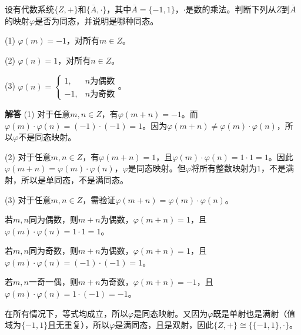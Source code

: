 \documentclass[a4paper,12pt]{ctexart}
\begin{document}
\begin{例题}[判断同态]
	设有代数系统$\{Z, +\}$和$\{\overline{A}, \cdot\}$，其中$\overline{A} = \{-1, 1\}$，$\cdot$是数的乘法。判断下列从$Z$到$\overline{A}$的映射$\varphi$是否为同态，并说明是哪种同态。
	
	(1) $\varphi(m) = -1$，对所有$m \in Z$。
	
	(2) $\varphi(n) = 1$，对所有$n \in Z$。
	
	(3) $\varphi(n)=\begin{cases}1, & n\text{为偶数}\\-1, & n\text{为奇数}\end{cases}$。
\end{例题}
\textbf{解答}\quad
(1) 对于任意$m, n \in Z$，有$\varphi(m+n) = -1$。而$\varphi(m) \cdot \varphi(n) = (-1) \cdot (-1) = 1$。因为$\varphi(m+n) \neq \varphi(m) \cdot \varphi(n)$，所以$\varphi$不是同态映射。

(2) 对于任意$m, n \in Z$，有$\varphi(m+n) = 1$，且$\varphi(m) \cdot \varphi(n) = 1 \cdot 1 = 1$。因此$\varphi(m+n) = \varphi(m) \cdot \varphi(n)$，$\varphi$是同态映射。但$\varphi$将所有整数映射为$1$，不是满射，所以是单同态，不是满同态。

(3) 对于任意$m, n \in Z$，需验证$\varphi(m+n) = \varphi(m) \cdot \varphi(n)$。

若$m, n$同为偶数，则$m+n$为偶数，$\varphi(m+n)=1$，且$\varphi(m) \cdot \varphi(n) = 1 \cdot 1 = 1$。

若$m, n$同为奇数，则$m+n$为偶数，$\varphi(m+n)=1$，且$\varphi(m) \cdot \varphi(n) = (-1) \cdot (-1) = 1$。

若$m, n$一奇一偶，则$m+n$为奇数，$\varphi(m+n)=-1$，且$\varphi(m) \cdot \varphi(n) = 1 \cdot (-1) = -1$。

在所有情况下，等式均成立，所以$\varphi$是同态映射。又因为$\varphi$既是单射也是满射（值域为$\{-1, 1\}$且无重复），所以$\varphi$是满同态，且是双射，因此$\{Z, +\} \cong \{\{-1, 1\}, \cdot\}$。
	
\end{document}
